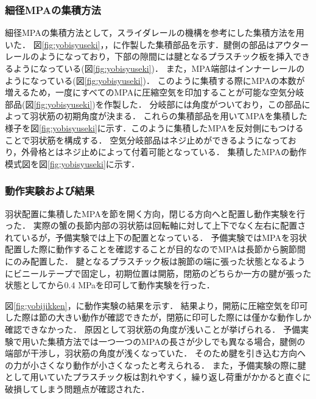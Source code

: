 \subsubsection{細径MPAの集積方法}
細径MPAの集積方法として，スライダレールの機構を参考にした集積方法を用いた．
図\ref{fig:yobisyuseki}，，に作製した集積部品を示す．腱側の部品はアウターレールのようになっており，下部の隙間には腱となるプラスチック板を挿入できるようになっている(図\ref{fig:yobisyuseki})．
また，MPA端部はインナーレールのようになっている(図\ref{fig:yobisyuseki})．
このように集積する際にMPAの本数が増えるため，一度にすべてのMPAに圧縮空気を印加することが可能な空気分岐部品(図\ref{fig:yobisyuseki})を作製した．
分岐部には角度がついており，この部品によって羽状筋の初期角度が決まる．
これらの集積部品を用いてMPAを集積した様子を図\ref{fig:yobisyuseki}に示す．このように集積したMPAを反対側にもつけることで羽状筋を構成する．
空気分岐部品はネジ止めができるようになっており，外骨格とはネジ止めによって付着可能となっている．
集積したMPAの動作模式図を図\ref{fig:yobisyuseki}に示す．
\subsubsection{動作実験および結果}
羽状配置に集積したMPAを節を開く方向，閉じる方向へと配置し動作実験を行った．
実際の蟹の長節内部の羽状筋は回転軸に対して上下でなく左右に配置されているが，予備実験では上下の配置となっている．
予備実験ではMPAを羽状配置した際に動作することを確認することが目的なのでMPAは長節から腕節間にのみ配置した．
腱となるプラスチック板は腕節の端に張った状態となるようにビニールテープで固定し，初期位置は開筋，閉筋のどちらか一方の腱が張った状態としてから0.4 MPaを印可して動作実験を行った．

図\ref{fig:yobijikken}，に動作実験の結果を示す．
結果より，開筋に圧縮空気を印可した際は節の大きい動作が確認できたが，閉筋に印可した際には僅かな動作しか確認できなかった．
原因として羽状筋の角度が浅いことが挙げられる．
予備実験で用いた集積方法では一つ一つのMPAの長さが少しでも異なる場合，腱側の端部が干渉し，羽状筋の角度が浅くなっていた．
そのため腱を引き込む方向への力が小さくなり動作が小さくなったと考えられる．
また，予備実験の際に腱として用いていたプラスチック板は割れやすく，繰り返し荷重がかかると直ぐに破損してしまう問題点が確認された．
